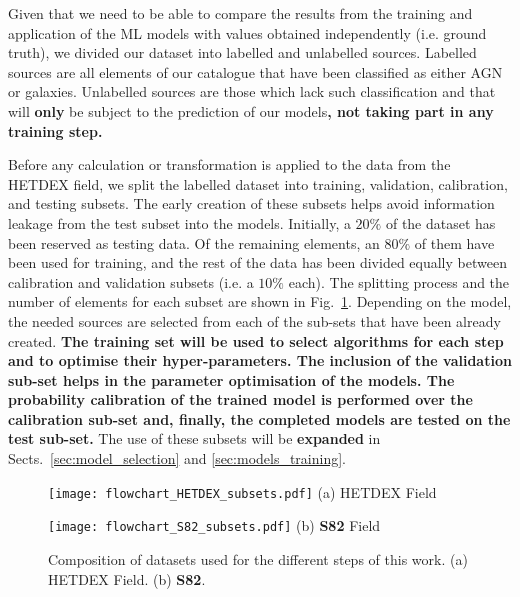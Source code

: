 \documentclass{aa}
\begin{document}
Given that we need to be able to compare the results from the training and application of the ML models with values obtained independently (i.e. ground truth), we divided our dataset into labelled and unlabelled sources. Labelled sources are all elements of our catalogue that have been classified as either AGN or galaxies. Unlabelled sources are those which lack such classification and that will \textbf{only} be subject to the prediction of our models\textbf{, not taking part in any training step.}

Before any calculation or transformation is applied to the data from the HETDEX field, we split the labelled dataset into training, validation, calibration, and testing subsets. The early creation of these subsets helps avoid information leakage from the test subset into the models. Initially, a $20 \%$ of the dataset has been reserved as testing data. Of the remaining elements, an $80 \%$ of them have been used for training, and the rest of the data has been divided equally between calibration and validation subsets (i.e. a $10 \%$ each). The splitting process and the number of elements for each subset are shown in Fig.~\ref{fig:dataset_sizes}. Depending on the model, the needed sources are selected from each of the sub-sets that have been already created. \textbf{The training set will be used to select algorithms for each step and to optimise their hyper-parameters. The inclusion of the validation sub-set helps in the parameter optimisation of the models. The probability calibration of the trained model is performed over the calibration sub-set and, finally, the completed models are tested on the test sub-set.} The use of these subsets will be \textbf{expanded} in Sects.~\ref{sec:model_selection} and \ref{sec:models_training}.

\begin{figure}
  \centering
  \begin{minipage}{0.65\columnwidth}
    \centering
    \texttt{[image: flowchart\_HETDEX\_subsets.pdf]}\hfill\break
    {(a) HETDEX Field}
  \end{minipage}
  \hfill
  \begin{minipage}{0.34\columnwidth}
    \centering
    \texttt{[image: flowchart\_S82\_subsets.pdf]}
    \vspace{3.6cm}\hfill\break
    {(b) \textbf{S82} Field}
  \end{minipage}
  \caption{Composition of datasets used for the different steps of this work. (a) HETDEX Field. (b) \textbf{S82}.}
  \label{fig:dataset_sizes}
\end{figure}
\end{document}
